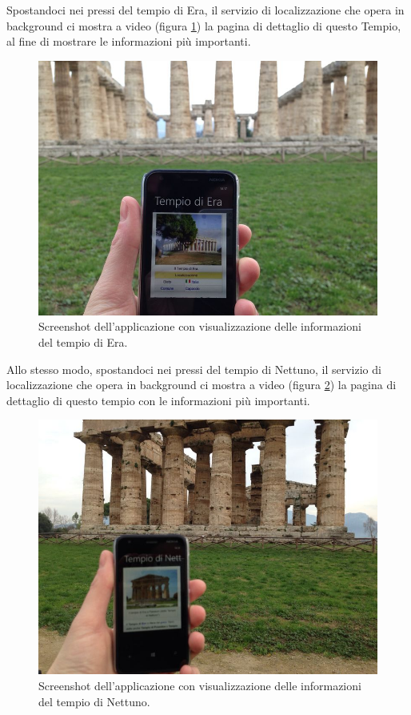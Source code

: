 Spostandoci nei pressi del tempio di Era, il servizio di localizzazione che opera in background ci mostra a video (figura \ref{tempiodiera}) la pagina di dettaglio di questo Tempio, al fine di mostrare le informazioni più importanti.
\begin{figure}[h!]
\begin{center}
\includegraphics[scale=0.4]{imgs/immaginiapp/tempiodiera.jpg} 
\caption{Screenshot dell'applicazione con visualizzazione delle informazioni del tempio di Era.\label{tempiodiera}}
\end{center}
\end{figure}


Allo stesso modo, spostandoci nei pressi del tempio di Nettuno, il servizio di localizzazione che opera in background ci mostra a video (figura \ref{tempiodinettuno}) la pagina di dettaglio di questo tempio con le informazioni più importanti.

\begin{figure}[h!]
\begin{center}
\includegraphics[scale=0.4]{imgs/immaginiapp/tempiodinettuno.jpg} 
\caption{Screenshot dell'applicazione con visualizzazione delle informazioni del tempio di Nettuno.\label{tempiodinettuno}}
\end{center}
\end{figure}


